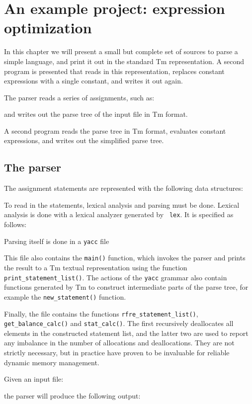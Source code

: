 \chapter{An example project: expression optimization}
\label{s.calc}
In this chapter we will present a small but complete set of sources to parse
a simple language, and print it out in the standard Tm representation.
A second program is presented that reads in this representation,
replaces constant expressions with a single constant, and writes
it out again.

The parser reads a series of assignments, such as:
\begin{showfile}
\end{showfile}
and writes out the parse tree of the input file in Tm format.

A second program reads the parse tree in Tm format, evaluates constant
expressions, and writes out the simplified parse tree.

\section{The parser}
\label{s.calcparser}
The assignment statements are represented with the following data structures:
\begin{showfile}
\end{showfile}

To read in the statements, lexical analysis and parsing must be done.
Lexical analysis is done with a lexical analyzer generated by {\tt
lex}. It is specified as follows:
\begin{showfile}
\end{showfile}

Parsing itself is done in a {\tt yacc} file
\begin{showfile}
\end{showfile}

This file also contains the \verb'main()' function, which invokes the
parser and prints the result to a Tm textual representation using the
function \verb'print_statement_list()'. The actions of the {\tt yacc}
grammar also contain functions generated by Tm to construct intermediate 
parts of the parse tree, for example the \verb'new_statement()' function.

Finally, the file contains the functions \verb'rfre_statement_list()',
\verb'get_balance_calc()' and \verb'stat_calc()'. The first recursively
deallocates all elements in the constructed statement list, and the latter
two are used to report any imbalance in the number of allocations and
deallocations. They are not strictly necessary, but in practice have
proven to be invaluable for reliable dynamic memory management.
\par
Given an input file:
\begin{showfile}
\end{showfile}
the parser will produce the following output:
\begin{showfile}
\end{showfile}
